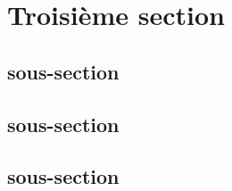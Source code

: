 \section{Troisième section}
\subsection{sous-section}
\lipsum[2]
\subsection{sous-section}
\lipsum[2]
\subsection{sous-section}
\lipsum[2]